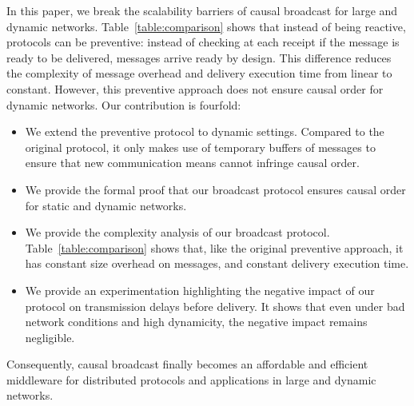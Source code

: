 
In this paper, we break the scalability barriers of causal broadcast for large
and dynamic networks. Table~\ref{table:comparison} shows that instead of being
reactive, protocols can be preventive: instead of checking at each receipt if
the message is ready to be delivered, messages arrive ready by design.
This difference reduces the complexity of message overhead and delivery
execution time from linear to constant.
However, this preventive approach does not ensure causal order for dynamic
networks.
Our contribution is fourfold:
\begin{itemize}
\item We extend the preventive protocol to dynamic settings. Compared to the
  original protocol, it only makes use of temporary buffers of messages to
  ensure that new communication means cannot infringe causal order.
\item We provide the formal proof that our broadcast protocol ensures causal
  order for static and dynamic networks.
\item We provide the complexity analysis of our broadcast
  protocol. Table~\ref{table:comparison} shows that, like the original
  preventive approach, it has constant size overhead on messages, and constant
  delivery execution time.
\item We provide an experimentation highlighting the negative impact of our
  protocol on transmission delays before delivery. It shows that even under bad
  network conditions and high dynamicity, the negative impact remains
  negligible.
\end{itemize}
Consequently, causal broadcast finally becomes an affordable and efficient
middleware for distributed protocols and applications in large and dynamic
networks.

